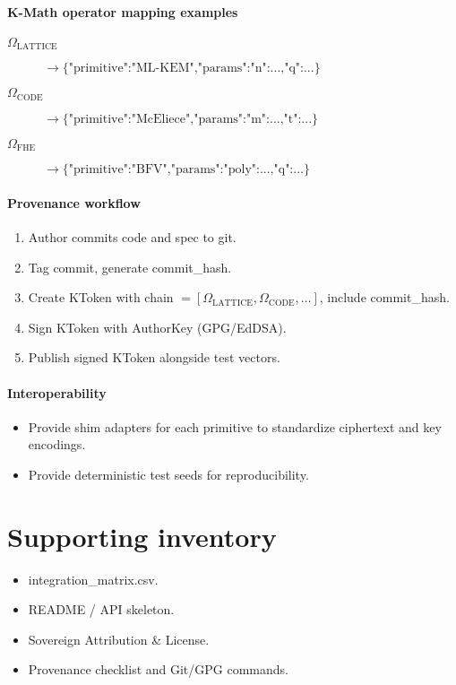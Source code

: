 \documentclass[11pt, a4paper]{article}
\begin{document}
\paragraph{K-Math operator mapping examples}
\begin{description}
    \item[$\Omega_{\text{LATTICE}}$] $\rightarrow \{\text{"primitive":"ML-KEM","params":{"n":...,"q":...}}\}$
    \item[$\Omega_{\text{CODE}}$] $\rightarrow \{\text{"primitive":"McEliece","params":{"m":...,"t":...}}\}$
    \item[$\Omega_{\text{FHE}}$] $\rightarrow \{\text{"primitive":"BFV","params":{"poly":...,"q":...}}\}$
\end{description}

\paragraph{Provenance workflow}
\begin{enumerate}
    \item Author commits code and spec to git.
    \item Tag commit, generate commit\_hash.
    \item Create KToken with chain $= [\Omega_{\text{LATTICE}}, \Omega_{\text{CODE}}, \ldots]$, include commit\_hash.
    \item Sign KToken with AuthorKey (GPG/EdDSA).
    \item Publish signed KToken alongside test vectors.
\end{enumerate}

\paragraph{Interoperability}
\begin{itemize}
    \item Provide shim adapters for each primitive to standardize ciphertext and key encodings.
    \item Provide deterministic test seeds for reproducibility.
\end{itemize}

\section*{Supporting inventory}
\begin{itemize}
    \item integration\_matrix.csv.
    \item README / API skeleton.
    \item Sovereign Attribution \& License.
    \item Provenance checklist and Git/GPG commands.
\end{itemize}
\end{document}
